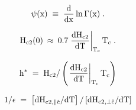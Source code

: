 {\newpage
\clearpage
\samepage \begin{displaymath}\rm \psi (x) \; \equiv \; \frac{d}{dx} \ln \Gamma(x) \; .
\end{displaymath}
}

{\newpage
\clearpage
\samepage \begin{figure}\vspace{16cm}

\label{whhfit}
\end{figure}
}

{\newpage
\clearpage
\samepage \begin{displaymath}\rm H_{c2}(0) \: \approx \: 0.7 \left.  \frac{dH_{c2}}{dT} \right|_{T_c}  T_c
\; .
\end{displaymath}
}

{\newpage
\clearpage
\samepage \begin{displaymath}\rm h^* \; = \;  H_{c2}/ \left( \left. \frac{dH_{c2}}{dT}\right|_{T_c} T_c \right)
\end{displaymath}
}

{\newpage
\clearpage
\samepage \begin{figure}\vspace{5.5in}

\label{sumtemp}
\end{figure}
}

{\newpage
\clearpage
\samepage \begin{displaymath}\rm 1 / \epsilon \; = \; \left[ dH_{c2, \parallel \hat{c}}/dT \right] /
\left[ dH_{c2, \perp \hat{c}}/dT  \right]
\end{displaymath}
}

